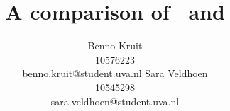 \documentclass[11pt]{article}
\title{A comparison of \ddop~and \dops}
\author{Benno Kruit\\10576223\\benno.kruit@student.uva.nl\And
Sara Veldhoen\\10545298\\sara.veldhoen@student.uva.nl}
\date{}
\begin{document}
\newcommand{\dops}[0]{DOP$ ^*$}
\newcommand{\ddop}[0]{Double-DOP}

\maketitle













%
%



\end{document}
